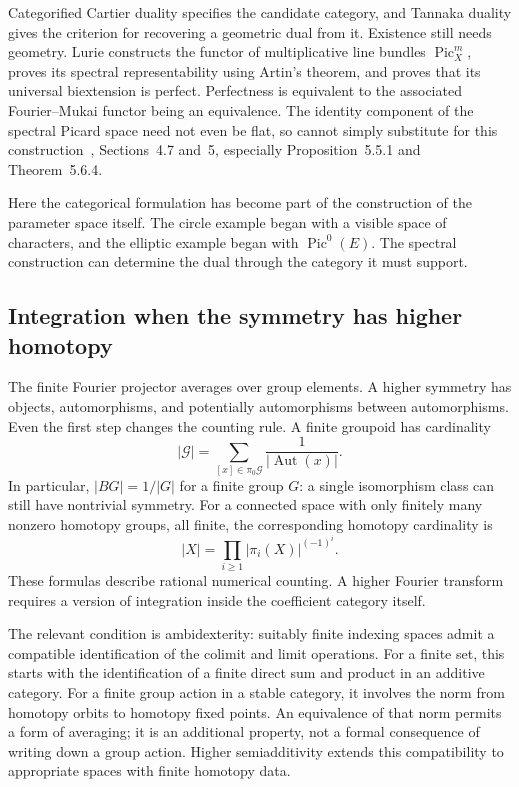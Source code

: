 \documentclass[11pt]{article}
\theoremstyle{remark}
\begin{document}
Categorified Cartier duality specifies the candidate category, and Tannaka duality gives the criterion for recovering a geometric dual from it. Existence still needs geometry. Lurie constructs the functor of multiplicative line bundles \(\operatorname{Pic}^m_X\), proves its spectral representability using Artin's theorem, and proves that its universal biextension is perfect. Perfectness is equivalent to the associated Fourier--Mukai functor being an equivalence. The identity component of the spectral Picard space need not even be flat, so cannot simply substitute for this construction~\cite{lurie-elliptic}, Sections~4.7 and~5, especially Proposition~5.5.1 and Theorem~5.6.4.

Here the categorical formulation has become part of the construction of the parameter space itself. The circle example began with a visible space of characters, and the elliptic example began with \(\operatorname{Pic}^0(E)\). The spectral construction can determine the dual through the category it must support.

\subsection{Integration when the symmetry has higher homotopy}

The finite Fourier projector averages over group elements. A higher symmetry has objects, automorphisms, and potentially automorphisms between automorphisms. Even the first step changes the counting rule. A finite groupoid has cardinality
\[
|\mathcal G|=\sum_{[x]\in\pi_0\mathcal G}
\frac{1}{|\operatorname{Aut}(x)|}.
\]
In particular, \(|BG|=1/|G|\) for a finite group \(G\): a single isomorphism class can still have nontrivial symmetry. For a connected space with only finitely many nonzero homotopy groups, all finite, the corresponding homotopy cardinality is
\[
|X|=\prod_{i\geq1}|\pi_i(X)|^{(-1)^i}.
\]
These formulas describe rational numerical counting. A higher Fourier transform requires a version of integration inside the coefficient category itself.

The relevant condition is ambidexterity: suitably finite indexing spaces admit a compatible identification of the colimit and limit operations. For a finite set, this starts with the identification of a finite direct sum and product in an additive category. For a finite group action in a stable category, it involves the norm from homotopy orbits to homotopy fixed points. An equivalence of that norm permits a form of averaging; it is an additional property, not a formal consequence of writing down a group action. Higher semiadditivity extends this compatibility to appropriate spaces with finite homotopy data.
\end{document}
